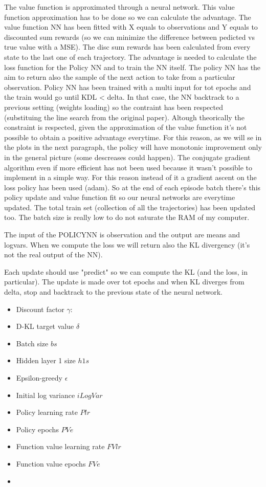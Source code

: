 \documentclass[11pt]{article}
\begin{document}
The value function is approximated through a neural network. This value function
approximation has to be done so we can calculate the advantage. The value function NN has
been fitted with X equals to observations and Y equals to discounted sum rewards (so we
can minimize the difference between pedicted vs true value with a MSE). The disc sum
rewards has been calculated from every state to the last one of each trajectory. The advantage is
needed to calculate the loss function for the Policy NN and to train the NN itself. The
policy NN has the aim to return also the sample of the next action to take from a
particular observation. Policy NN has been trained with a multi input for tot epochs and
the train would go until KDL < delta. In that case, the NN backtrack to a previous setting
(weights loading) so the contraint has been respected (substituing the line search from
the original paper). Altough theorically the constraint is respected, given the
approximation of the value function it's not possible to obtain a positive advantage
everytime. For this reason, as we will se in the plots in the next paragraph, the policy
will have monotonic improvement only in the general picture (some descreases could
happen). The conjugate gradient algorithm even if more efficient has not been used because
it wasn't possible to implement in a simple way. For this reason instead of it a gradient
ascent on the loss policy has been used (adam). So at the end of each episode batch
there's this policy update and value function fit so our neural networks are everytime
updated. The total train set (collection of all the trajectories) has been updated too.
The batch size is really low to do not saturate the RAM of my computer.

The input of the POLICYNN is observation and the output are means and logvars.
When we compute the loss we will return also the KL divergency (it's not the real output
of the NN).

Each update should use "predict" so we can compute the KL (and the loss, in particular).
The update is made over tot epochs and when KL diverges from delta, stop and backtrack to
the previous state of the neural network.

\begin{itemize}
        \item Discount factor $\gamma$:
        \item D-KL target value $\delta$
        \item Batch size $bs$
        \item Hidden layer 1 size $h1s$
        \item Epsilon-greedy $\epsilon$
        \item Initial log variance $iLogVar$
        \item Policy learning rate $Plr$
        \item Policy epochs $PVe$
        \item Function value learning rate $FVlr$
        \item Function value epochs $FVe$
        \item 
\end{itemize}
\end{document}
